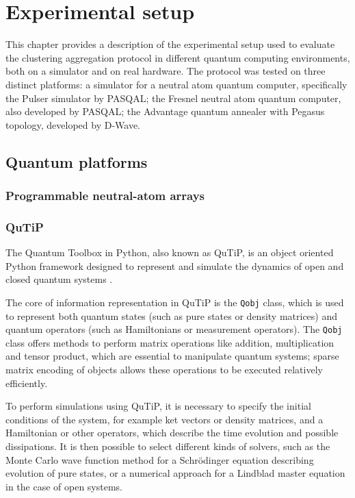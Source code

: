 \chapter{Experimental setup}
This chapter provides a description of the experimental setup used to evaluate the clustering aggregation protocol in different quantum computing environments, both on a simulator and on real hardware. The protocol was tested on three distinct platforms: a simulator for a neutral atom quantum computer, specifically the Pulser simulator by PASQAL; the Fresnel neutral atom quantum computer, also developed by PASQAL; the Advantage quantum annealer with Pegasus topology, developed by D-Wave.

\section{Quantum platforms}
\subsection{Programmable neutral-atom arrays}

\subsection{QuTiP}
The Quantum Toolbox in Python, also known as QuTiP, is an object oriented Python framework designed to represent and simulate the dynamics of open and closed quantum systems \cite{Johansson2012}. 

The core of information representation in QuTiP is the \texttt{Qobj} class, which is used to represent both quantum states (such as pure states or density matrices) and quantum operators (such as Hamiltonians or measurement operators). The \texttt{Qobj} class offers methods to perform matrix operations like addition, multiplication and tensor product, which are essential to manipulate quantum systems; sparse matrix encoding of objects allows these operations to be executed relatively efficiently.

To perform simulations using QuTiP, it is necessary to specify the initial conditions of the system, for example ket vectors or density matrices, and a Hamiltonian or other operators, which describe the time evolution and possible dissipations. It is then possible to select different kinds of solvers, such as the Monte Carlo wave function method for a Schrödinger equation describing evolution of pure states, or a numerical approach for a Lindblad master equation in the case of open systems.

